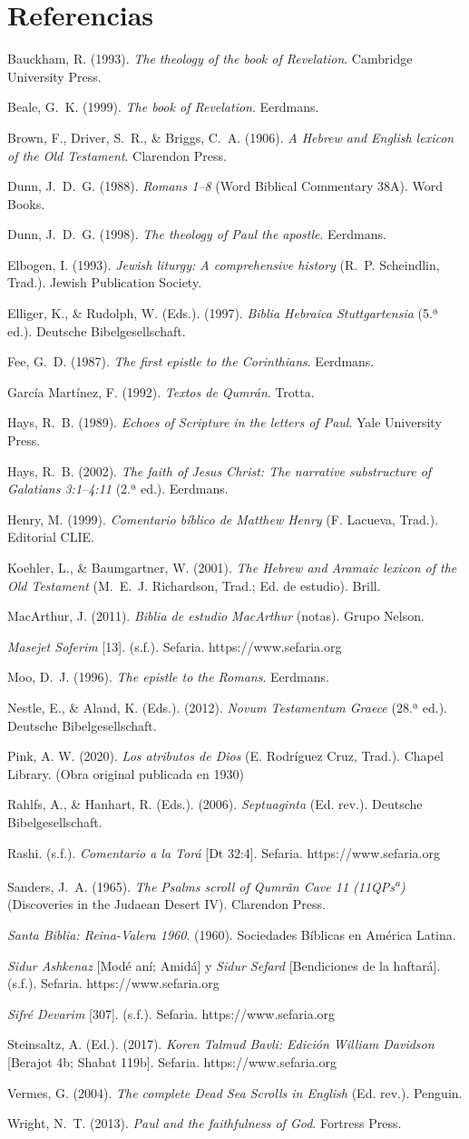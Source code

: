 \documentclass[11pt,letterpaper]{article}
\newcommand{\refapa}[1]{\par{\RaggedRight\hangindent=1.27cm\hangafter=1\noindent #1\par}\vspace{4pt}}
\begin{document}
\section*{Referencias}
\refapa{Bauckham, R. (1993). \emph{The theology of the book of Revelation}. Cambridge University Press.}
\refapa{Beale, G.~K. (1999). \emph{The book of Revelation}. Eerdmans.}
\refapa{Brown, F., Driver, S.~R., \& Briggs, C.~A. (1906). \emph{A Hebrew and English lexicon of the Old Testament}. Clarendon Press.}
\refapa{Dunn, J.~D.~G. (1988). \emph{Romans 1--8} (Word Biblical Commentary 38A). Word Books.}
\refapa{Dunn, J.~D.~G. (1998). \emph{The theology of Paul the apostle}. Eerdmans.}
\refapa{Elbogen, I. (1993). \emph{Jewish liturgy: A comprehensive history} (R.~P. Scheindlin, Trad.). Jewish Publication Society.}
\refapa{Elliger, K., \& Rudolph, W. (Eds.). (1997). \emph{Biblia Hebraica Stuttgartensia} (5.ª ed.). Deutsche Bibelgesellschaft.}
\refapa{Fee, G.~D. (1987). \emph{The first epistle to the Corinthians}. Eerdmans.}
\refapa{García Martínez, F. (1992). \emph{Textos de Qumrán}. Trotta.}
\refapa{Hays, R.~B. (1989). \emph{Echoes of Scripture in the letters of Paul}. Yale University Press.}
\refapa{Hays, R.~B. (2002). \emph{The faith of Jesus Christ: The narrative substructure of Galatians 3:1--4:11} (2.ª ed.). Eerdmans.}
\refapa{Henry, M. (1999). \emph{Comentario bíblico de Matthew Henry} (F. Lacueva, Trad.). Editorial CLIE.}
\refapa{Koehler, L., \& Baumgartner, W. (2001). \emph{The Hebrew and Aramaic lexicon of the Old Testament} (M.~E.~J. Richardson, Trad.; Ed. de estudio). Brill.}
\refapa{MacArthur, J. (2011). \emph{Biblia de estudio MacArthur} (notas). Grupo Nelson.}
\refapa{\emph{Masejet Soferim} [13]. (s.f.). Sefaria. https://www.sefaria.org}
\refapa{Moo, D.~J. (1996). \emph{The epistle to the Romans}. Eerdmans.}
\refapa{Nestle, E., \& Aland, K. (Eds.). (2012). \emph{Novum Testamentum Graece} (28.ª ed.). Deutsche Bibelgesellschaft.}
\refapa{Pink, A. W. (2020). \emph{Los atributos de Dios} (E. Rodríguez Cruz, Trad.). Chapel Library. (Obra original publicada en 1930)}
\refapa{Rahlfs, A., \& Hanhart, R. (Eds.). (2006). \emph{Septuaginta} (Ed. rev.). Deutsche Bibelgesellschaft.}
\refapa{Rashi. (s.f.). \emph{Comentario a la Torá} [Dt 32:4]. Sefaria. https://www.sefaria.org}
\refapa{Sanders, J.~A. (1965). \emph{The Psalms scroll of Qumrân Cave 11 (11QPs\textsuperscript{a})} (Discoveries in the Judaean Desert IV). Clarendon Press.}
\refapa{\emph{Santa Biblia: Reina-Valera 1960}. (1960). Sociedades Bíblicas en América Latina.}
\refapa{\emph{Sidur Ashkenaz} [Modé aní; Amidá] y \emph{Sidur Sefard} [Bendiciones de la haftará]. (s.f.). Sefaria. https://www.sefaria.org}
\refapa{\emph{Sifré Devarim} [307]. (s.f.). Sefaria. https://www.sefaria.org}
\refapa{Steinsaltz, A. (Ed.). (2017). \emph{Koren Talmud Bavli: Edición William Davidson} [Berajot 4b; Shabat 119b]. Sefaria. https://www.sefaria.org}
\refapa{Vermes, G. (2004). \emph{The complete Dead Sea Scrolls in English} (Ed. rev.). Penguin.}
\refapa{Wright, N.~T. (2013). \emph{Paul and the faithfulness of God}. Fortress Press.}
\end{document}
